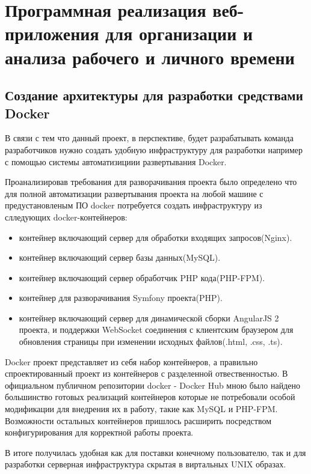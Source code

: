\section{Программная реализация веб-приложения для организации и анализа рабочего и личного времени}

\subsection{Создание архитектуры для разработки средствами Docker}
В связи с тем что данный проект, в перспективе, будет разрабатывать команда разработчиков нужно создать удобную инфраструктуру для разработки например с помощью системы автоматизициии развертывания Docker. 

Проанализировав требования для разворачивания проекта было определено что для полной автоматизации развертывания проекта на любой машине с предустановленым ПО docker потребуется создать инфраструктуру из слледующих docker-контейнеров:
\begin{itemize}
  \item контейнер включающий сервер для обработки входящих запросов(Nginx).
  \item контейнер включающий сервер базы данных(MySQL).
  \item контейнер включающий сервер обработчик PHP кода(PHP-FPM). 
  \item контейнер для разворачивания Symfony проекта(PHP).
  \item контейнер включающий сервер для динамической сборки AngularJS 2 проекта, и поддержки WebSocket соединения с клиентским браузером для обновления страницы при изменении исходных файлов(.html, .css, .ts).
\end{itemize}

Docker проект представляет из себя набор контейнеров, а правильно спроектированный проект из контейнеров с разделенной отвественностью. В официальном публичном репозитории docker - Docker Hub мною было найдено большинство готовых реализаций контейнеров которые не потребовали особой модификации для внедрения их в работу, такие как MySQL и PHP-FPM. Возможности остальных контейнеров пришлось расширить посредством конфигурирования для корректной работы проекта.

В итоге получилась удобная как для поставки конечному пользователю, так и для разработки серверная инфраструктура скрытая в виртальных UNIX образах. 



\hfill
\clearpage